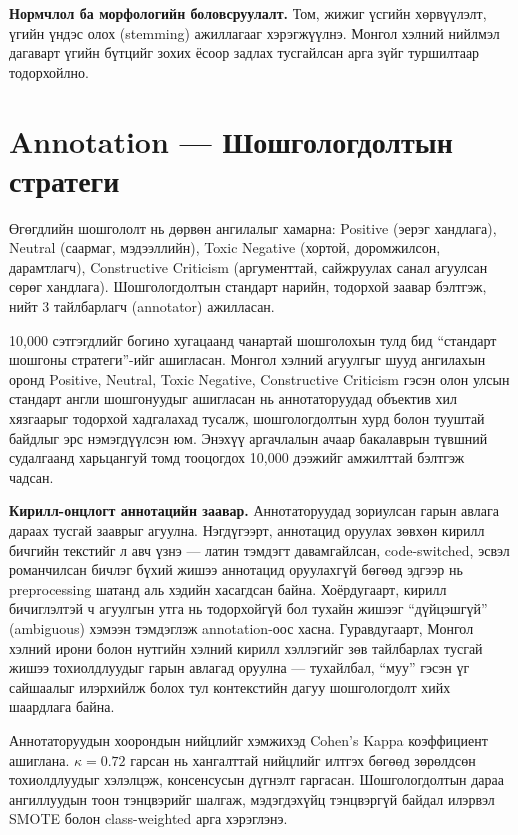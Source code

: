 \textbf{Нормчлол ба морфологийн боловсруулалт.} Том, жижиг үсгийн хөрвүүлэлт,
үгийн үндэс олох (stemming) ажиллагааг хэрэгжүүлнэ. Монгол хэлний нийлмэл
дагаварт үгийн бүтцийг зохих ёсоор задлах тусгайлсан арга зүйг туршилтаар
тодорхойлно.

\section{Annotation --- Шошгологдолтын стратеги}

Өгөгдлийн шошгололт нь дөрвөн ангилалыг хамарна: Positive (эерэг хандлага),
Neutral (саармаг, мэдээллийн), Toxic Negative (хортой, доромжилсон, дарамтлагч),
Constructive Criticism (аргументтай, сайжруулах санал агуулсан сөрөг хандлага).
Шошгологдолтын стандарт нарийн, тодорхой заавар бэлтгэж, нийт 3
тайлбарлагч (annotator) ажилласан.

10,000 сэтгэгдлийг богино хугацаанд чанартай шошголохын тулд бид ``стандарт
шошгоны стратеги''-ийг ашигласан. Монгол хэлний агуулгыг шууд ангилахын оронд
Positive, Neutral, Toxic Negative, Constructive Criticism гэсэн олон улсын
стандарт англи шошгонуудыг ашигласан нь аннотаторуудад объектив хил хязгаарыг
тодорхой хадгалахад тусалж, шошгологдолтын хурд болон тууштай байдлыг эрс
нэмэгдүүлсэн юм. Энэхүү аргачлалын ачаар бакалаврын түвшний судалгаанд
харьцангуй томд тооцогдох 10,000 дээжийг амжилттай бэлтгэж чадсан.

\textbf{Кирилл-онцлогт аннотацийн заавар.} Аннотаторуудад зориулсан гарын авлага
дараах тусгай зааврыг агуулна. Нэгдүгээрт, аннотацид оруулах зөвхөн кирилл
бичгийн текстийг л авч үзнэ --- латин тэмдэгт давамгайлсан, code-switched, эсвэл
романчилсан бичлэг бүхий жишээ аннотацид оруулахгүй бөгөөд эдгээр нь
preprocessing шатанд аль хэдийн хасагдсан байна. Хоёрдугаарт, кирилл бичиглэлтэй
ч агуулгын утга нь тодорхойгүй бол тухайн жишээг ``дүйцэшгүй'' (ambiguous)
хэмээн тэмдэглэж annotation-оос хасна. Гуравдугаарт, Монгол хэлний ирони болон
нутгийн хэлний кирилл хэллэгийг зөв тайлбарлах тусгай жишээ тохиолдлуудыг
гарын авлагад оруулна --- тухайлбал, ``муу'' гэсэн үг сайшаалыг илэрхийлж болох
тул контекстийн дагуу шошгологдолт хийх шаардлага байна.

Аннотаторуудын хоорондын нийцлийг хэмжихэд Cohen's Kappa коэффициент ашиглана.
$\kappa = 0.72$ гарсан нь хангалттай нийцлийг илтгэх бөгөөд зөрөлдсөн тохиолдлуудыг
хэлэлцэж, консенсусын дүгнэлт гаргасан.
 Шошгологдолтын дараа ангиллуудын тоон
тэнцвэрийг шалгаж, мэдэгдэхүйц тэнцвэргүй байдал илэрвэл SMOTE болон
class-weighted арга хэрэглэнэ.


